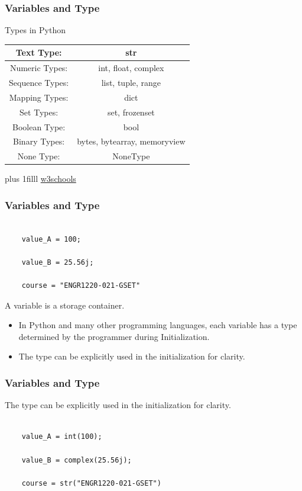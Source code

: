 \documentclass[fleqn]{beamer} %
\newcommand{\sectiontitleII}{Variables and Type}
\newcommand{\btVFill}{\vskip0pt plus 1filll}
\begin{document}
	\begin{frame} \small
		\frametitle{\sectiontitleII}
			
		Types in Python \vspace{5mm}\\
		\renewcommand*{\arraystretch}{1.5}
		\begin{tabular}{|c|c|}\hline			
			Text Type:& str  \\ \hline
			Numeric Types: & int, float, complex \\ \hline
			Sequence Types:& list, tuple, range \\ \hline 	
			Mapping Types:& dict \\ \hline
			Set Types:& set, frozenset\\ \hline
			Boolean Type:& bool \\ \hline
			Binary Types:& bytes, bytearray, memoryview\\ \hline
			None Type: & NoneType\\ \hline	 			
		\end{tabular}
	
	\btVFill
	{\tiny \href{https://www.w3schools.com/python/python_datatypes.asp}{w3schools}}
	\end{frame}


	\begin{frame}[label=sectionII,containsverbatim] \small
		\frametitle{\sectiontitleII}

			\begin{lstlisting}
			
	value_A = 100; 
				
	value_B = 25.56j;

	course = "ENGR1220-021-GSET"
			\end{lstlisting}
	
			A variable is a storage container.
			\begin{itemize}
				\item In Python and many other programming languages, each variable has a type determined by the programmer during {\BL Initialization}.
				\item The type can be explicitly used in the initialization for clarity.
			\end{itemize}
	
		\end{frame}

	\begin{frame}[label=sectionII,containsverbatim] \small
		\frametitle{\sectiontitleII}
	
	  The type can be explicitly used in the initialization for clarity.
		

		\begin{lstlisting}
			
	value_A = int(100); 
				
	value_B = complex(25.56j);

	course = str("ENGR1220-021-GSET")
			\end{lstlisting}

	
		\end{frame}
\end{document}

